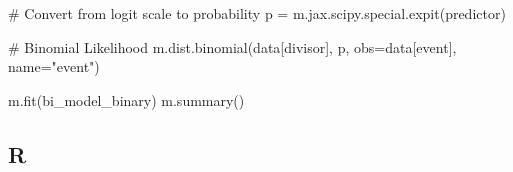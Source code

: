 \documentclass[
  letterpaper,
  DIV=11,
  numbers=noendperiod]{scrartcl}
\newenvironment{Shaded}{\begin{snugshade}}{\end{snugshade}}
\newcommand{\CommentTok}[1]{\textcolor[rgb]{0.37,0.37,0.37}{#1}}
\newcommand{\NormalTok}[1]{\textcolor[rgb]{0.00,0.23,0.31}{#1}}
\newcommand{\OperatorTok}[1]{\textcolor[rgb]{0.37,0.37,0.37}{#1}}
\newcommand{\StringTok}[1]{\textcolor[rgb]{0.13,0.47,0.30}{#1}}
\begin{document}
\begin{Shaded}
\begin{Highlighting}[]
    \CommentTok{\# Convert from logit scale to probability}
\NormalTok{    p }\OperatorTok{=}\NormalTok{ m.jax.scipy.special.expit(predictor)}
    
    \CommentTok{\# Binomial Likelihood}
\NormalTok{    m.dist.binomial(data[}\StringTok{\textquotesingle{}divisor\textquotesingle{}}\NormalTok{], p, obs}\OperatorTok{=}\NormalTok{data[}\StringTok{\textquotesingle{}event\textquotesingle{}}\NormalTok{], name}\OperatorTok{=}\StringTok{"event"}\NormalTok{)}

\NormalTok{m.fit(bi\_model\_binary)}
\NormalTok{m.summary()}
\end{Highlighting}
\end{Shaded}

\subsection{R}\label{r}
\end{document}
